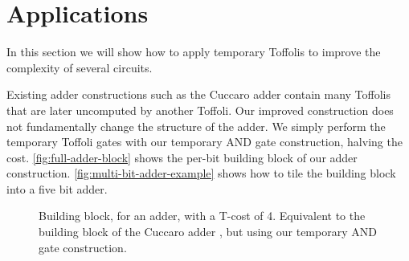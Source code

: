 \documentclass[twocolumn,longbibliography]{quantumarticle-customized}
\begin{document}
\section{Applications}
\label{sec:circuit-constructions}

In this section we will show how to apply temporary Toffolis to improve the complexity of several circuits.

Existing adder constructions such as the Cuccaro adder \cite{Cuccaro2004} contain many Toffolis that are later uncomputed by another Toffoli.
Our improved construction does not fundamentally change the structure of the adder.
We simply perform the temporary Toffoli gates with our temporary AND gate construction, halving the cost.
\autoref{fig:full-adder-block} shows the per-bit building block of our adder construction.
\autoref{fig:multi-bit-adder-example} shows how to tile the building block into a five bit adder.

\begin{figure}
  \caption{
	Building block, for an adder, with a T-cost of 4.
	Equivalent to the building block of the Cuccaro adder \cite{Cuccaro2004}, but using our temporary AND gate construction.
  }
  \label{fig:full-adder-block}
\end{figure}
\end{document}
